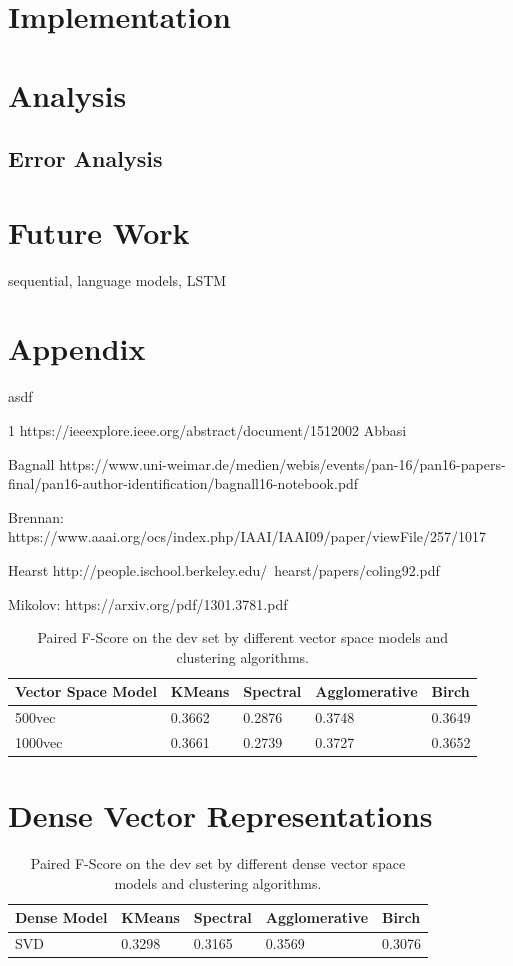 \documentclass[12pt]{article}
\begin{document}
\section{Implementation}

\section{Analysis}
\subsection{Error Analysis}

\section{Future Work}
sequential, language models, LSTM

\section{Appendix}

asdf

1 https://ieeexplore.ieee.org/abstract/document/1512002 Abbasi

Bagnall https://www.uni-weimar.de/medien/webis/events/pan-16/pan16-papers-final/pan16-author-identification/bagnall16-notebook.pdf

Brennan: https://www.aaai.org/ocs/index.php/IAAI/IAAI09/paper/viewFile/257/1017

Hearst http://people.ischool.berkeley.edu/~hearst/papers/coling92.pdf

Mikolov: https://arxiv.org/pdf/1301.3781.pdf

\begin{table}[]
\centering
\begin{tabular}{l|l|l|l|l}
Vector Space Model	& KMeans	& Spectral		& Agglomerative	& Birch \\
\hline
500vec			& 0.3662	& 0.2876		& 0.3748			& 0.3649 \\
1000vec			& 0.3661	& 0.2739		& 0.3727			& 0.3652 \\        
\end{tabular}
\caption{Paired F-Score on the dev set by different vector space models and clustering algorithms.}
\label{tab:sparseresults}
\end{table}

\section{Dense Vector Representations}



\begin{table}[!h]
\centering
\begin{tabular}{l|l|l|l|l}
Dense Model	& KMeans	& Spectral		& Agglomerative	& Birch \\
\hline
SVD			& 0.3298	& 0.3165		& 0.3569			& 0.3076 \\
\end{tabular}
\caption{Paired F-Score on the dev set by different dense vector space models and clustering algorithms.}
\label{tab:denseresults}
\end{table}
\end{document}
